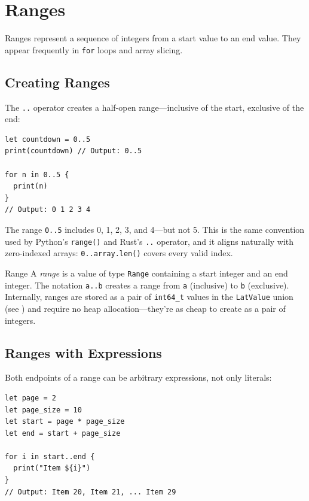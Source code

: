 \section{Ranges}\label{sec:ranges}

Ranges represent a sequence of integers from a start value to an end value. They appear frequently in \lstinline|for| loops and array slicing.

\subsection{Creating Ranges}\label{sec:creating-ranges}

The \lstinline|..| operator creates a half-open range---inclusive of the start, exclusive of the end:

\begin{lstlisting}[language=Lattice, caption={Half-open ranges}]
let countdown = 0..5
print(countdown) // Output: 0..5

for n in 0..5 {
  print(n)
}
// Output: 0 1 2 3 4
\end{lstlisting}

The range \lstinline|0..5| includes 0, 1, 2, 3, and 4---but not 5. This is the same convention used by Python's \lstinline|range()| and Rust's \lstinline|..| operator, and it aligns naturally with zero-indexed arrays: \lstinline|0..array.len()| covers every valid index.

\begin{defnbox}{Range}
A \emph{range} is a value of type \lstinline|Range| containing a start integer and an end integer. The notation \lstinline|a..b| creates a range from \lstinline|a| (inclusive) to \lstinline|b| (exclusive). Internally, ranges are stored as a pair of \lstinline|int64_t| values in the \lstinline|LatValue| union (see ) and require no heap allocation---they're as cheap to create as a pair of integers.
\end{defnbox}

\subsection{Ranges with Expressions}\label{sec:range-expressions}

Both endpoints of a range can be arbitrary expressions, not only literals:

\begin{lstlisting}[language=Lattice, caption={Dynamic range endpoints}]
let page = 2
let page_size = 10
let start = page * page_size
let end = start + page_size

for i in start..end {
  print("Item ${i}")
}
// Output: Item 20, Item 21, ... Item 29
\end{lstlisting}

